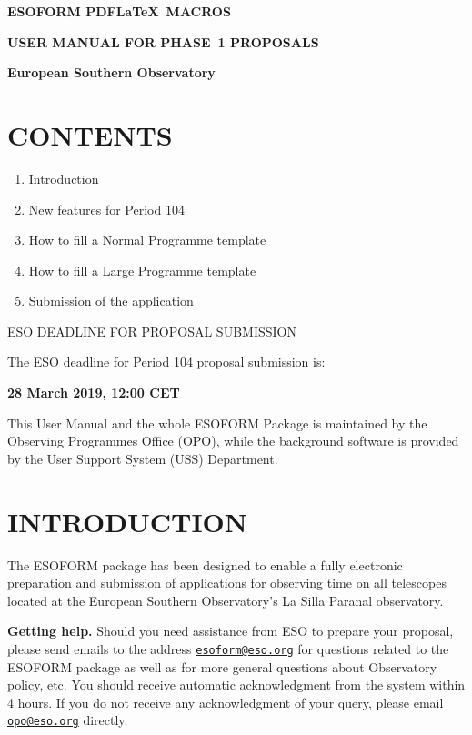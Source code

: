 \documentclass{article}
\begin{document}
\centerline{{\Large{\bf ESOFORM PDF\LaTeX\ MACROS}}}
\bigskip
\centerline{{\Large{\bf USER MANUAL FOR PHASE~1 PROPOSALS }}}
\bigskip
\centerline{{\bf European Southern Observatory }}
\vspace{3cm}

\def\period{104}

\section*{CONTENTS} 

\begin{enumerate}  
\item Introduction 
\item New features for Period 104
\item How to fill a Normal Programme template 
\item How to fill a Large  Programme template 
\item Submission of the application 
\end{enumerate} 

\vspace{3.0truecm}

\centerline{\large ESO DEADLINE FOR PROPOSAL SUBMISSION }
\medskip
\centerline{The ESO deadline for Period 104 proposal submission is:}
\medskip
\centerline{\huge \bf 28 March 2019, 12:00 CET}

\vfill

\noindent This User Manual and the whole ESOFORM Package is
maintained by the Observing Programmes Office (OPO),
while the background software
is provided by the User Support System (USS) Department.

\break

\section{INTRODUCTION}

The ESOFORM package has been designed to enable a fully
electronic preparation and submission of applications for observing
time on all telescopes located at the European Southern Observatory's
La Silla Paranal observatory.

{\bf Getting help.} Should you need assistance from ESO to prepare
your proposal, please send emails to the address
\href{mailto:esoform@eso.org}{\tt esoform@eso.org} for questions
related to the ESOFORM package as well as for more general questions
about Observatory policy, etc.
You should receive automatic acknowledgment from the system within 
4 hours. If you do not receive any acknowledgment of your query, 
please email 
\href{mailto:opo@eso.org}{\tt opo@eso.org} directly.
\end{document}
